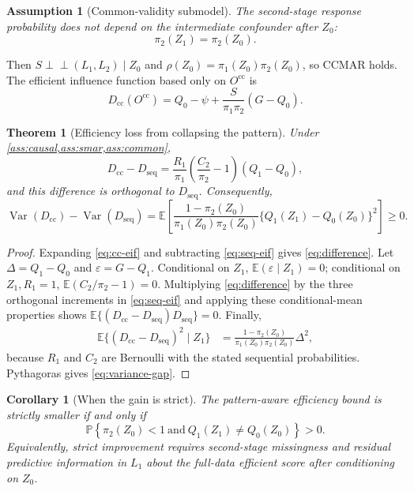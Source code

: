 \documentclass[11pt]{article}
\newtheorem{assumption}{Assumption}
\newtheorem{theorem}{Theorem}
\newtheorem{corollary}{Corollary}
\theoremstyle{definition}
\newcommand{\E}{\mathbb{E}}
\newcommand{\Pp}{\mathbb{P}}
\newcommand{\Var}{\operatorname{Var}}
\newcommand{\indep}{\perp\!\!\!\perp}
\newcommand{\1}{\mathbf{1}}
\newcommand{\cc}{\mathrm{cc}}
\newcommand{\seq}{\mathrm{seq}}
\begin{document}
\begin{assumption}[Common-validity submodel]\label{ass:common}
The second-stage response probability does not depend on the intermediate confounder after $Z_0$:
\[
\pi_2(Z_1)=\pi_2(Z_0).
\]
\end{assumption}

Then $S\indep(L_1,L_2)\mid Z_0$ and $\rho(Z_0)=\pi_1(Z_0)\pi_2(Z_0)$, so CCMAR
holds. The efficient influence function based only on $O^{\cc}$ is
\begin{equation}\label{eq:cc-eif}
D_{\cc}(O^{\cc})=Q_0-\psi+
\frac{S}{\pi_1\pi_2}(G-Q_0).
\end{equation}

\begin{theorem}[Efficiency loss from collapsing the pattern]\label{thm:gap}
Under \cref{ass:causal,ass:smar,ass:common},
\begin{equation}\label{eq:difference}
D_{\cc}-D_{\seq}
=\frac{R_1}{\pi_1}\left(\frac{C_2}{\pi_2}-1\right)(Q_1-Q_0),
\end{equation}
and this difference is orthogonal to $D_{\seq}$. Consequently,
\begin{equation}\label{eq:variance-gap}
\boxed{
\Var(D_{\cc})-\Var(D_{\seq})
=\E\!\left[
\frac{1-\pi_2(Z_0)}{\pi_1(Z_0)\pi_2(Z_0)}
\{Q_1(Z_1)-Q_0(Z_0)\}^2
\right]\ge0.}
\end{equation}
\end{theorem}

\begin{proof}
Expanding \cref{eq:cc-eif} and subtracting \cref{eq:seq-eif} gives \cref{eq:difference}. Let $\Delta=Q_1-Q_0$ and $\varepsilon=G-Q_1$. Conditional on $Z_1$, $\E(\varepsilon\mid Z_1)=0$; conditional on $Z_1,R_1=1$, $\E(C_2/\pi_2-1)=0$. Multiplying \cref{eq:difference} by the three orthogonal increments in \cref{eq:seq-eif} and applying these conditional-mean properties shows
$\E\{(D_{\cc}-D_{\seq})D_{\seq}\}=0$. Finally,
\begin{align*}
\E\{(D_{\cc}-D_{\seq})^2\mid Z_1\}
&=\frac{1-\pi_2(Z_0)}{\pi_1(Z_0)\pi_2(Z_0)}\Delta^2,
\end{align*}
because $R_1$ and $C_2$ are Bernoulli with the stated sequential probabilities. Pythagoras gives \cref{eq:variance-gap}.
\end{proof}

\begin{corollary}[When the gain is strict]\label{cor:strict}
The pattern-aware efficiency bound is strictly smaller if and only if
\[
\Pp\!\left\{\pi_2(Z_0)<1\ \text{and}\ Q_1(Z_1)\ne Q_0(Z_0)\right\}>0.
\]
Equivalently, strict improvement requires second-stage missingness and residual predictive information in $L_1$ about the full-data efficient score after conditioning on $Z_0$.
\end{corollary}
\end{document}
